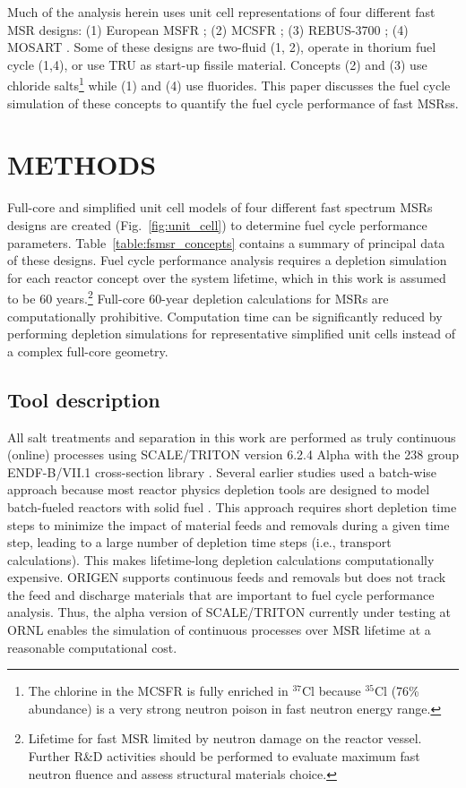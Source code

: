 \documentclass{anstrans}
\begin{document}
Much of the analysis herein uses unit cell representations of four different fast \gls{MSR} designs: 
(1) European \gls{MSFR} \cite{noauthor_final_2015}; 
(2) \gls{MCSFR} \cite{simmons_assessment_1974}; 
(3) REBUS-3700 \cite{mourogov_potentialities_2006}; 
(4) \gls{MOSART} \cite{ignatiev_progress_2007}. 
Some of these designs are two-fluid (1, 2), operate in thorium fuel cycle (1,4), or use \gls{TRU} as start-up fissile material. Concepts (2) and (3) use chloride salts\footnote{The chlorine in the \gls{MCSFR} is fully enriched in $^{37}$Cl because $^{35}$Cl (76\% abundance) is a very strong neutron poison in fast neutron energy range.} while (1) and (4) use fluorides. This paper discusses the fuel cycle simulation of these concepts to quantify the fuel cycle performance of fast \glspl{MSR}s.

\section{METHODS} 
\label{sec:methods}
Full-core and simplified unit cell models of four different fast spectrum \glspl{MSR} designs are created (Fig.~\ref{fig:unit_cell}) to determine fuel cycle performance parameters.  Table~\ref{table:fsmsr_concepts} contains a summary of principal data of these designs. Fuel cycle performance analysis requires a depletion simulation for each reactor concept over the system lifetime, which in this work is assumed to be 60 years.\footnote{Lifetime for fast \gls{MSR} limited by neutron damage on the reactor vessel. Further R\&D activities should be performed to evaluate maximum fast neutron fluence and assess structural materials choice.} Full-core 60-year depletion calculations for \gls{MSR}s are computationally prohibitive. Computation time can be significantly reduced by performing depletion simulations for representative simplified unit cells instead of a complex full-core geometry.

\subsection{Tool description} 
All salt treatments and separation in this work are performed as truly continuous (online) processes using SCALE/TRITON version 6.2.4 Alpha \cite{betzler_molten_2017-1} with the 238 group ENDF-B/VII.1 cross-section library \cite{rearden_scale_2016}. Several earlier studies used a batch-wise approach because most reactor physics depletion tools are designed to model batch-fueled reactors with solid fuel \cite{betzler_molten_2017, rykhlevskii_online_2017}. This approach requires short depletion time steps to minimize the impact of material feeds and removals during a given time step, leading to a large number of depletion time steps (i.e., transport calculations). This makes lifetime-long depletion calculations computationally expensive. ORIGEN \cite{gauld_isotopic_2011} supports continuous feeds and removals but does not track the feed and discharge materials that are important to fuel cycle performance analysis. Thus, the alpha version of SCALE/TRITON currently under testing at \gls{ORNL} enables the simulation of continuous processes over \gls{MSR} lifetime at a reasonable computational cost.
\end{document}
